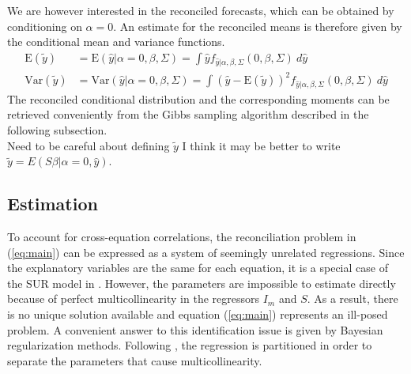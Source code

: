 \documentclass[a4paper,fleqn,11pt]{article}
\begin{document}
We are however interested in the reconciled forecasts, which can be obtained by conditioning on $\alpha = 0$. An estimate for the reconciled means is therefore given by the conditional mean and variance functions.
\begin{align*}
\text{E}(\tilde{y}) &= \text{E}(\hat{y}|\alpha = 0,\beta,\Sigma) = \int \hat{y} f_{\hat{y}|\alpha,\beta,\Sigma}(0,\beta,\Sigma)\ d\hat{y} \\
\text{Var}(\tilde{y}) &= \text{Var}(\hat{y}|\alpha = 0,\beta,\Sigma) =  \int (\hat{y} - \text{E}(\tilde{y}))^2 f_{\hat{y}|\alpha,\beta,\Sigma}(0,\beta,\Sigma)\ d\hat{y}
\end{align*}
The reconciled conditional distribution and the corresponding moments can be retrieved conveniently from the Gibbs sampling algorithm described in the following subsection.\\

{\color{red} Need to be careful about defining $\tilde{y}$  I think it may be better to write $\tilde{y}=E(S\beta|\alpha=0,\hat{y})$.}\\

\subsection{Estimation}
To account for cross-equation correlations, the reconciliation problem in (\ref{eq:main}) can be expressed as a system of seemingly unrelated regressions. Since the explanatory variables are the same for each equation, it is a special case of the SUR model in \cite{Zellner1962}. However, the parameters are impossible to estimate directly because of perfect multicollinearity in the regressors $I_m$ and $S$. As a result, there is no unique solution available and equation (\ref{eq:main}) represents an ill-posed problem. A convenient answer to this identification issue is given by Bayesian regularization methods. Following \cite{Farebrother1978}, the regression is partitioned in order to separate the parameters that cause multicollinearity.\\
\end{document}
